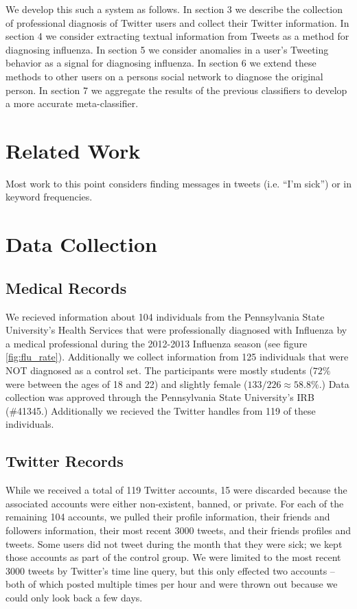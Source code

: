 \documentclass{acm_proc_article-sp}
\begin{document}
We develop this such a system as follows. In section 3 we describe the collection of professional diagnosis of Twitter users and collect their Twitter information. In section 4 we consider extracting textual information from Tweets as a method for diagnosing influenza. In section 5 we consider anomalies in a user's Tweeting behavior as a signal for diagnosing influenza. In section 6 we extend these methods to other users on a persons social network to diagnose the original person. In section 7 we aggregate the results of the previous classifiers to develop a more accurate meta-classifier.

\section{Related Work}


Most work to this point considers finding messages in tweets (i.e. ``I'm sick'') or in keyword frequencies. 



\section{Data Collection}
\subsection{Medical Records}
We recieved information about 104 individuals from the Pennsylvania State University's Health Services that were professionally diagnosed with Influenza by a medical professional during the 2012-2013 Influenza season (see figure \ref{fig:flu_rate}).  Additionally we collect information from 125 individuals that were NOT diagnosed as a control set. The participants were mostly students (\(72\%\) were between the ages of 18 and 22) and slightly female (\(133 / 226 \approx 58.8\%\).) Data collection was approved through the Pennsylvania State University's IRB (\#41345.) Additionally we recieved the Twitter handles from 119 of these individuals.

\subsection{Twitter Records}
While we received a total of 119 Twitter accounts, 15 were discarded because the associated accounts were either non-existent, banned, or private. For each of the remaining 104 accounts, we pulled their profile information, their friends and followers information, their most recent 3000 tweets, and their friends profiles and tweets. Some users did not tweet during the month that they were sick; we kept those accounts as part of the control group. We were limited to the most recent 3000 tweets by Twitter's time line query, but this only effected two accounts -- both of which posted multiple times per hour and were thrown out because we could only look back a few days.
\end{document}
